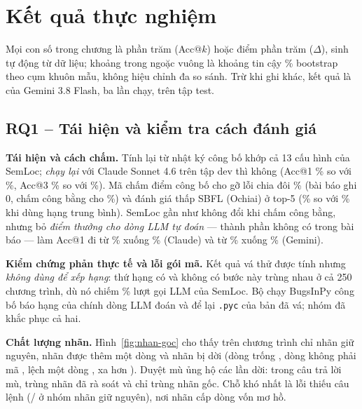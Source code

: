 \chapter{Kết quả thực nghiệm}
\label{chap:ket-qua}

Mọi con số trong chương là phần trăm (Acc@$k$) hoặc điểm phần trăm ($\Delta$), sinh tự động từ dữ liệu; khoảng trong
ngoặc vuông là khoảng tin cậy \ConstCiLevel\% bootstrap theo cụm khuôn mẫu, không hiệu chỉnh đa so sánh. Trừ khi ghi
khác, kết quả là của Gemini 3.8 Flash, ba lần chạy, trên tập test.

\section{RQ1 -- Tái hiện và kiểm tra cách đánh giá}
\label{sec:rq1}

\textbf{Tái hiện và cách chấm.} Tính lại từ nhật ký công bố khớp cả 13 cấu hình của SemLoc; \emph{chạy lại} với Claude
Sonnet 4.6 trên tập dev thì không (Acc@1 \RepClaudeDevRerunAccOne\% so với \RepClaudeDevPublishedAccOne\%, Acc@3
\RepClaudeDevRerunAccThree\% so với \RepClaudeDevPublishedAccThree\%). Mã chấm điểm công bố cho gỡ lỗi chia đôi \RqOneDdAuthorAllAccOne\% (bài báo ghi 0, chấm công bằng
cho \RqOneDdFairAllAccOne\%) và đánh giá thấp SBFL (Ochiai) ở top-5 (\RqOneSbflOchiaiAuthorAllAccFive\% so với
\RqOneSbflOchiaiFairAllAccFive\% khi dùng hạng trung bình). SemLoc gần như không đổi khi chấm công bằng, nhưng bỏ
\emph{điểm thưởng cho dòng LLM tự đoán} --- thành phần không có trong bài báo --- làm Acc@1 đi từ
\RqOneSemlocClaudeTZeroEightFairAllAccOne\% xuống \RqOneSemlocClaudeTZeroEightNoPriorFairAllAccOne\% (Claude) và từ
\RqOneSemlocGeminiTZeroEightFairAllAccOne\% xuống \RqOneSemlocGeminiTZeroEightNoPriorFairAllAccOne\% (Gemini).

\textbf{Kiểm chứng phản thực tế và lỗi gói mã.} Kết quả vá thử được tính nhưng \emph{không dùng để xếp hạng}: thứ hạng có
và không có bước này trùng nhau ở cả 250 chương trình, dù nó chiếm \CostCfSharePct\% lượt gọi LLM của SemLoc. Bộ chạy
BugsInPy công bố báo hạng của chính dòng LLM đoán và để lại \texttt{.pyc} của bản đã vá; nhóm đã khắc phục cả hai.

\textbf{Chất lượng nhãn.} Hình~\ref{fig:nhan-goc} cho thấy trên \LabaudAllN{} chương trình chỉ \LabaudAllSame{} nhãn
giữ nguyên, \LabaudAllExtended{} nhãn được thêm một dòng và \LabaudAllMoved{} nhãn bị dời (dòng trống \LabaudAllBlank,
dòng không phải mã \LabaudAllNonCode, lệch một dòng \LabaudAllOffByOne, xa hơn \LabaudAllFarther). Duyệt mù ủng hộ các
lần dời: trong \BlindBlindAllNReviewed{} câu trả lời mù, \BlindBlindAllMatchReviewed{} trùng nhãn đã rà soát và chỉ
\BlindBlindAllMatchOriginal{} trùng nhãn gốc. Chỗ khó nhất là lỗi thiếu câu lệnh (\BlindBlindKeptMatchReviewed{}/\BlindBlindKeptNReviewed{} ở nhóm nhãn giữ
nguyên), nơi nhãn cấp dòng vốn mơ hồ.

